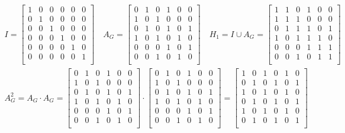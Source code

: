 \documentclass[fleqn, 12pt]{article}
\theoremstyle{definition}
\begin{document}
\begin{gather*}
I = 
\begin{bmatrix}
1 & 0 & 0 & 0 & 0 & 0 \\
0 & 1 & 0 & 0 & 0 & 0 \\
0 & 0 & 1 & 0 & 0 & 0 \\
0 & 0 & 0 & 1 & 0 & 0 \\
0 & 0 & 0 & 0 & 1 & 0 \\
0 & 0 & 0 & 0 & 0 & 1  \\
\end{bmatrix} 
\quad 
A_G = 
\begin{bmatrix}
0 & 1 & 0 & 1 & 0 & 0 \\
1 & 0 & 1 & 0 & 0 & 0 \\
0 & 1 & 0 & 1 & 0 & 1 \\
1 & 0 & 1 & 0 & 1 & 0 \\
0 & 0 & 0 & 1 & 0 & 1 \\
0 & 0 & 1 & 0 & 1 & 0  \\
\end{bmatrix} 
\quad
H_1 = I \cup A_G = 
\begin{bmatrix}
1 & 1 & 0 & 1 & 0 & 0 \\
1 & 1 & 1 & 0 & 0 & 0 \\
0 & 1 & 1 & 1 & 0 & 1 \\
1 & 0 & 1 & 1 & 1 & 0 \\
0 & 0 & 0 & 1 & 1 & 1 \\
0 & 0 & 1 & 0 & 1 & 1  \\
\end{bmatrix} \\
A_G^2 = A_G \cdot A_G = 
\begin{bmatrix}
0 & 1 & 0 & 1 & 0 & 0 \\
1 & 0 & 1 & 0 & 0 & 0 \\
0 & 1 & 0 & 1 & 0 & 1 \\
1 & 0 & 1 & 0 & 1 & 0 \\
0 & 0 & 0 & 1 & 0 & 1 \\
0 & 0 & 1 & 0 & 1 & 0  \\
\end{bmatrix}
\cdot
\begin{bmatrix}
0 & 1 & 0 & 1 & 0 & 0 \\
1 & 0 & 1 & 0 & 0 & 0 \\
0 & 1 & 0 & 1 & 0 & 1 \\
1 & 0 & 1 & 0 & 1 & 0 \\
0 & 0 & 0 & 1 & 0 & 1 \\
0 & 0 & 1 & 0 & 1 & 0  \\
\end{bmatrix}
= 
\begin{bmatrix}
1 & 0 & 1 & 0 & 1 & 0 \\
0 & 1 & 0 & 1 & 0 & 1 \\
1 & 0 & 1 & 0 & 1 & 0 \\
0 & 1 & 0 & 1 & 0 & 1 \\
1 & 0 & 1 & 0 & 1 & 0 \\
0 & 1 & 0 & 1 & 0 & 1  \\
\end{bmatrix} 
\end{gather*}
\end{document}
